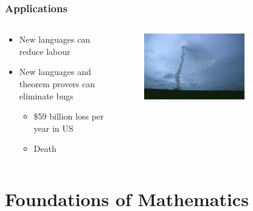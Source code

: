 \documentclass[aspectratio=169]{beamer}
\begin{document}
\begin{frame}
	\frametitle{Applications} 
	\begin{columns}
\begin{column}{0.5\textwidth}
		\begin{itemize} 
		\item<2-> New languages can reduce labour
		\item<3-> New languages and theorem provers can eliminate bugs
		\begin{itemize} 
			\item<4-> \$59 billion loss per year in US
			\item<5-> Death
		\end{itemize}
	\end{itemize}
\end{column}   
\begin{column}{0.5\textwidth}
	\begin{figure}
		\centering
		\includegraphics[width=0.7\textwidth]{ariane}
	\end{figure}
\end{column}
\end{columns}
\end{frame}

\section{Foundations of Mathematics} 
\end{document}
